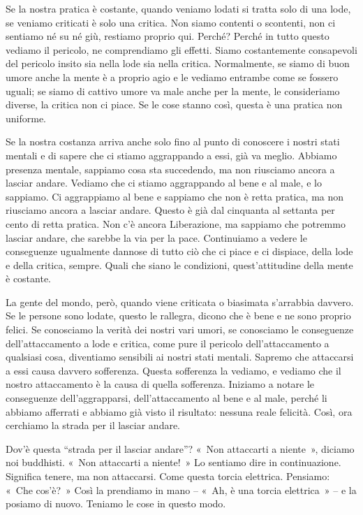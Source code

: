 Se la nostra pratica è costante, quando veniamo lodati si tratta solo di
una lode, se veniamo criticati è solo una critica. Non siamo contenti o
scontenti, non ci sentiamo né su né giù, restiamo proprio qui. Perché?
Perché in tutto questo vediamo il pericolo, ne comprendiamo gli effetti.
Siamo costantemente consapevoli del pericolo insito sia nella lode sia
nella critica. Normalmente, se siamo di buon umore anche la mente è a
proprio agio e le vediamo entrambe come se fossero uguali; se siamo di
cattivo umore va male anche per la mente, le consideriamo diverse, la
critica non ci piace. Se le cose stanno così, questa è una pratica non
uniforme.

Se la nostra costanza arriva anche solo fino al punto di conoscere i
nostri stati mentali e di sapere che ci stiamo aggrappando a essi, già
va meglio. Abbiamo presenza mentale, sappiamo cosa sta succedendo, ma
non riusciamo ancora a lasciar andare. Vediamo che ci stiamo aggrappando
al bene e al male, e lo sappiamo. Ci aggrappiamo al bene e sappiamo che
non è retta pratica, ma non riusciamo ancora a lasciar andare. Questo è
già dal cinquanta al settanta per cento di retta pratica. Non c'è ancora
Liberazione, ma sappiamo che potremmo lasciar andare, che sarebbe la via
per la pace. Continuiamo a vedere le conseguenze ugualmente dannose di
tutto ciò che ci piace e ci dispiace, della lode e della critica,
sempre. Quali che siano le condizioni, quest'attitudine della mente è
costante.

La gente del mondo, però, quando viene criticata o biasimata s'arrabbia
davvero. Se le persone sono lodate, questo le rallegra, dicono che è
bene e ne sono proprio felici. Se conosciamo la verità dei nostri vari
umori, se conosciamo le conseguenze dell'attaccamento a lode e critica,
come pure il pericolo dell'attaccamento a qualsiasi cosa, diventiamo
sensibili ai nostri stati mentali. Sapremo che attaccarsi a essi causa
davvero sofferenza. Questa sofferenza la vediamo, e vediamo che il
nostro attaccamento è la causa di quella sofferenza. Iniziamo a notare
le conseguenze dell'aggrapparsi, dell'attaccamento al bene e al male,
perché li abbiamo afferrati e abbiamo già visto il risultato: nessuna
reale felicità. Così, ora cerchiamo la strada per il lasciar andare.

Dov'è questa ``strada per il lasciar andare''? «~Non attaccarti a
niente~», diciamo noi buddhisti. «~Non attaccarti a niente!~» Lo
sentiamo dire in continuazione. Significa tenere, ma non attaccarsi.
Come questa torcia elettrica. Pensiamo: «~Che cos'è?~» Così la prendiamo
in mano -- «~Ah, è una torcia elettrica~» -- e la posiamo di nuovo.
Teniamo le cose in questo modo.

